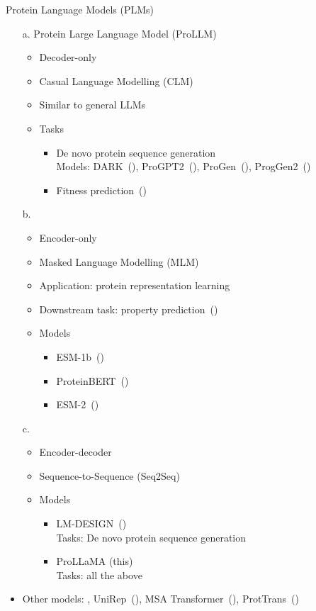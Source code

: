 \begin{frame}[shrink=10]{Protein Language Models (PLMs)}
	\begin{itemize}\setlength\itemsep{1.5em}
		\item[a.] Protein Large Language Model (ProLLM)
		\begin{itemize}
			\item Decoder-only
			\item Casual Language Modelling (CLM)
			\item Similar to general LLMs
			\item Tasks
			\begin{itemize}
				\item De novo protein sequence generation
				\\Models: DARK~(\cite{moffat2022design}), ProGPT2~(\cite{ferruz2022protgpt2}), ProGen~(\cite{madani2023large}), ProgGen2~(\cite{nijkamp2023progen2})
				\item Fitness prediction~(\cite{notin2022tranception})
			\end{itemize}
		\end{itemize}
		\item[b.] 
		\begin{itemize}
			\item Encoder-only
			\item Masked Language Modelling (MLM)
			\item Application: protein representation learning
			\item Downstream task: property prediction~(\cite{xu2023protst})
			\item Models
			\begin{itemize}
				\item ESM-1b~(\cite{rives2021biological})
				\item ProteinBERT~(\cite{brandes2022proteinbert})
				\item ESM-2~(\cite{lin2023evolutionary})
			\end{itemize}
		\end{itemize}
		\item[c.] 
		\begin{itemize}
			\item Encoder-decoder
			\item Sequence-to-Sequence (Seq2Seq)
			\item Models
			\begin{itemize}
				\item LM-DESIGN~(\cite{zheng2023structure})
				\\Tasks: De novo protein sequence generation
				\item ProLLaMA (this)
				\\Tasks: all the above
			\end{itemize}
		\end{itemize}
		\item Other models: \cite{yang2018learned}, UniRep~(\cite{alley2019unified}), MSA Transformer~(\cite{rao2021msa}), ProtTrans~(\cite{elnaggar2021prottrans})
	\end{itemize}
\end{frame}